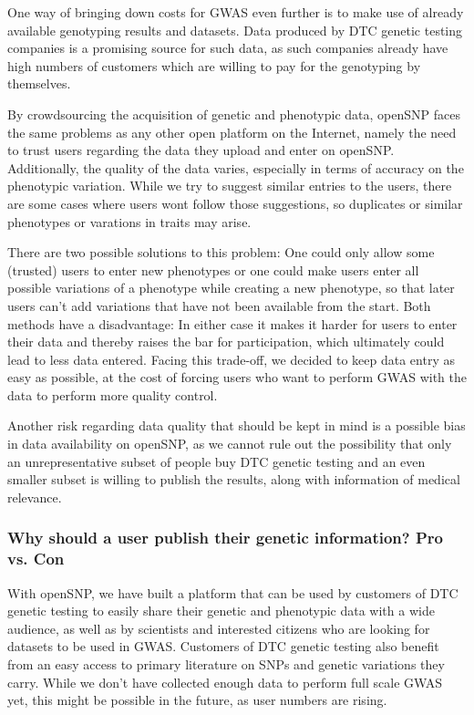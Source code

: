 \documentclass[10pt]{article}
\begin{document}
One way of bringing down costs for GWAS even further is to make use of already available genotyping results and datasets. Data produced by DTC genetic testing companies is a promising source for such data, as such companies already have high numbers of customers which are willing to pay for the genotyping by themselves.

By crowdsourcing the acquisition of genetic and phenotypic data, openSNP faces the same problems as any other open platform on the Internet, namely the need to trust users regarding the data they upload and enter on openSNP. Additionally, the quality of the data varies, especially in terms of accuracy on the phenotypic variation. While we try to suggest similar entries to the users, there are some cases where users wont follow those suggestions, so duplicates or similar phenotypes or varations in traits may arise. 

There are two possible solutions to this problem: One could only allow some (trusted) users to enter new phenotypes or one could make users enter all possible variations of a phenotype while creating a new phenotype, so that later users can't add variations that have not been available from the start. Both methods have a disadvantage: In either case it makes it harder for users to enter their data and thereby raises the bar for participation, which ultimately could lead to less data entered. Facing this trade-off, we decided to keep data entry as easy as possible, at the cost of forcing users who want to perform GWAS with the data to perform more quality control.

Another risk regarding data quality that should be kept in mind is a possible bias in data availability on openSNP, as we cannot rule out the possibility that only an unrepresentative subset of people buy DTC genetic testing and an even smaller subset is willing to publish the results, along with information of medical relevance.
\subsubsection*{Why should a user publish their genetic information? Pro vs. Con}
With openSNP, we have built a platform that can be used by customers of DTC genetic testing to easily share their genetic and phenotypic data with a wide audience, as well as by scientists and interested citizens who are looking for datasets to be used in GWAS. Customers of DTC genetic testing also benefit from an easy access to primary literature on SNPs and genetic variations they carry. While we don't have collected enough data to perform full scale GWAS yet, this might be possible in the future, as user numbers are rising. 
\end{document}
